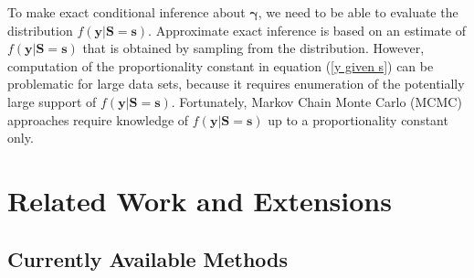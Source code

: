 \documentclass[article, shortnames]{jss}
\begin{document}
To make exact conditional inference about $\mathbf{\gamma }$,
we need to be able to evaluate the distribution
$f\left(\mathbf{y}|\mathbf{S=s}\right)$.
Approximate exact inference is
based on an estimate of $f\left(\mathbf{y}|\mathbf{S=s}\right)$
that is obtained by sampling from the distribution.
However, computation of the
proportionality constant in equation (\ref{y given s})
can be problematic for large data sets, because it
requires enumeration of the potentially large support of
$f\left( \mathbf{y}|\mathbf{S=s}\right)$.
Fortunately, Markov Chain Monte Carlo (MCMC)
approaches require knowledge of $f\left( \mathbf{y}|\mathbf{S=s}\right)$
up to a proportionality constant only.

\section{Related Work and Extensions} \label{Related work and extensions}

\subsection{Currently Available Methods}
\end{document}
